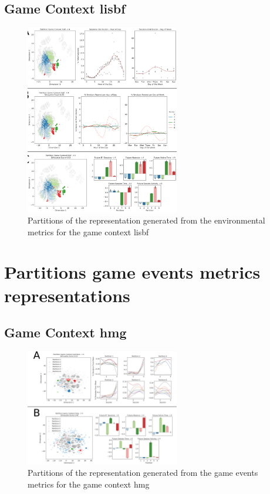 \subsection{Game Context lisbf}
\label{env_clust_lisbf}

\begin{figure}[!htb]
\includegraphics[width=0.6\textwidth]{images/appendix_D/clust_env_lisbf.png}
\centering
\caption[Partitions of the representation generated from the environmental metrics for the game context lisbf]{Partitions of the representation generated from the environmental metrics for the game context lisbf}
\end{figure}
\FloatBarrier

\section{Partitions game events metrics representations}
\label{partitions_game_events}

\subsection{Game Context hmg}
\label{even_clust_hmg}

\begin{figure}[!htb]
\includegraphics[width=0.6\textwidth]{images/appendix_D/clust_even_hmg.png}
\centering
\caption[Partitions of the representation generated from the game events metrics for the game context hmg]{Partitions of the representation generated from the game events metrics for the game context hmg}
\end{figure}
\FloatBarrier

